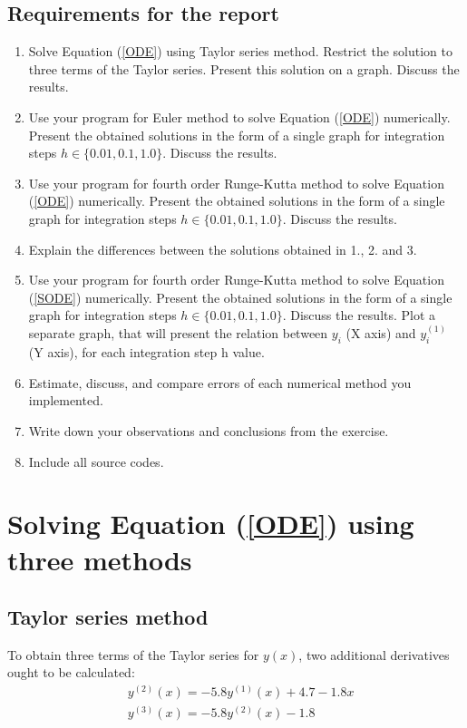 \documentclass[a4paper,12pt]{article}
\begin{document}
\subsection{Requirements for the report}
\begin{enumerate}
    \item Solve Equation (\ref{ODE}) using Taylor series method. Restrict the solution to three terms of the Taylor series. Present this solution on a graph. Discuss the results.
    \item Use your program for Euler method to solve Equation (\ref{ODE}) numerically. Present the obtained solutions in the form of a single graph for integration steps \linebreak[4] $h \in \{0.01, 0.1, 1.0\}$. Discuss the results.
    \item Use your program for fourth order Runge-Kutta method to solve Equation (\ref{ODE}) numerically. Present the obtained solutions in the form of a single graph for integration steps $h \in \{0.01, 0.1, 1.0\}$. Discuss the results.
    \item Explain the differences between the solutions obtained in 1., 2. and 3.
    \item Use your program for fourth order Runge-Kutta method to solve Equation (\ref{SODE}) numerically. Present the obtained solutions in the form of a single graph for integration steps $h \in \{0.01, 0.1, 1.0\}$. Discuss the results. Plot a separate graph, that will present the relation between $y_i$ (X axis) and $y^{(1)}_i$ (Y axis), for each integration step h value.
    \item Estimate, discuss, and compare errors of each numerical method you implemented.
    \item Write down your observations and conclusions from the exercise.
    \item Include all source codes.
\end{enumerate}

\section{Solving Equation (\ref{ODE}) using three methods}

\subsection{Taylor series method}
To obtain three terms of the Taylor series for $y(x)$, two additional derivatives ought to be calculated:
\begin{align*}
    &y^{(2)}(x) = -5.8y^{(1)}(x) + 4.7 - 1.8x \\
    &y^{(3)}(x) = -5.8y^{(2)}(x) - 1.8
\end{align*}
\end{document}

